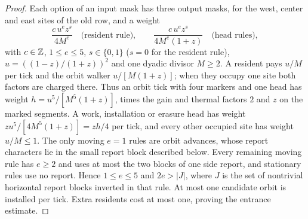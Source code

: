 \begin{proof}
Each option of an input mask has three output masks, for the west, center and east sites of the old row, and a weight
\[
 \frac{c\,u^ez^s}{4M^e}\quad\text{(resident rule)},\qquad
 \frac{c\,u^ez^s}{4M^e(1+z)}\quad\text{(head rules)},
\]
with \(c\in\mathbb Z\), \(1\le e\le5\), \(s\in\{0,1\}\) (\(s=0\) for the resident rule), \(u=((1-z)/(1+z))^2\) and one dyadic divisor \(M\ge2\). A resident pays \(u/M\) per tick and the orbit walker \(u/[M(1+z)]\); when they occupy one site both factors are charged there. Thus an orbit tick with four markers and one head has weight \(h=u^5/[M^5(1+z)]\), times the gain and thermal factors \(2\) and \(z\) on the marked segments. A work, installation or erasure head has weight \(zu^5/[4M^5(1+z)]=zh/4\) per tick, and every other occupied site has weight \(u/M\le1\). The only moving \(e=1\) rules are orbit advances, whose report characters lie in the small report block described below. Every remaining moving rule has \(e\ge2\) and uses at most the two blocks of one side report, and stationary rules use no report. Hence \(1\le e\le5\) and \(2e>|J|\), where \(J\) is the set of nontrivial horizontal report blocks inverted in that rule. At most one candidate orbit is installed per tick. Extra residents cost at most one, proving the entrance estimate.


\end{proof}
